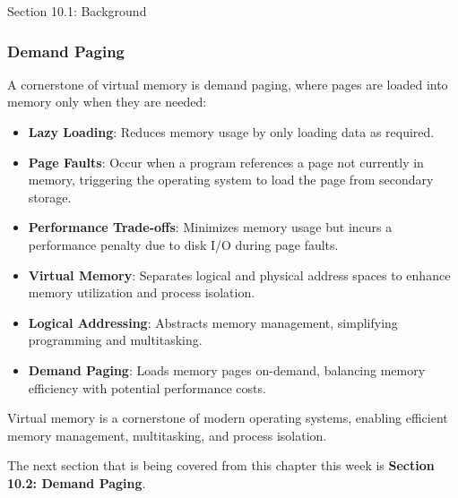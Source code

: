\begin{notes}{Section 10.1: Background}
    \subsubsection*{Demand Paging}
    
    A cornerstone of virtual memory is demand paging, where pages are loaded into memory only when they are needed:
    \begin{itemize}
        \item \textbf{Lazy Loading}: Reduces memory usage by only loading data as required.
        \item \textbf{Page Faults}: Occur when a program references a page not currently in memory, triggering the operating system to load the page from secondary storage.
        \item \textbf{Performance Trade-offs}: Minimizes memory usage but incurs a performance penalty due to disk I/O during page faults.
    \end{itemize}
    
    \begin{highlight}
    
        \begin{itemize}
            \item \textbf{Virtual Memory}: Separates logical and physical address spaces to enhance memory utilization and process isolation.
            \item \textbf{Logical Addressing}: Abstracts memory management, simplifying programming and multitasking.
            \item \textbf{Demand Paging}: Loads memory pages on-demand, balancing memory efficiency with potential performance costs.
        \end{itemize}
    
    Virtual memory is a cornerstone of modern operating systems, enabling efficient memory management, multitasking, and process isolation.
    
    \end{highlight}
\end{notes}

The next section that is being covered from this chapter this week is \textbf{Section 10.2: Demand Paging}.

